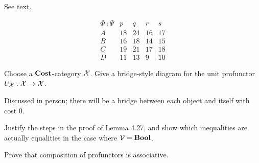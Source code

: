 See text.

\solution
$$\begin{array}{c|cccc}
\Phi \fcmp \Psi & p & q & r & s \\
\hline A & 18 & 24 & 16 & 17 \\
B & 16 & 18 & 14 & 15 \\
C & 19 & 21 & 17 & 18 \\
D & 11 & 13 & 9 & 10
\end{array}$$

Choose a $\textbf{Cost}$-category $\mathcal{X}$.  Give a bridge-style diagram for the unit profunctor $U_{\mathcal{X}}:\mathcal{X}\to\mathcal{X}$.

\solution
Discussed in person; there will be a bridge between each object and itself with cost 0.

Justify the steps in the proof of Lemma 4.27, and show which inequalities are actually equalities in the case where $\mathcal{V}=\textbf{Bool}$.

\solution

Prove that composition of profunctors is associative.

\solution






